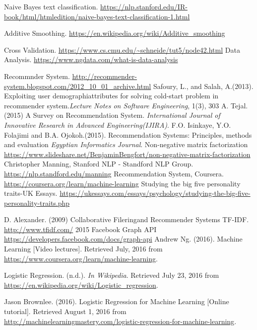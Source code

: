 \begin{thebibliography}{9}
	Naive Bayes text classification. \url{https://nlp.stanford.edu/IR-book/html/htmledition/naive-bayes-text-classification-1.html}

	Additive Smoothing. \url{https://en.wikipedia.org/wiki/Additive_smoothing}

Cross Validation. \url{https://www.cs.cmu.edu/~schneide/tut5/node42.html}
Data Analysis. \url{https://www.ngdata.com/what-is-data-analysis}

 Recommnder System. \url{http://recommender-system.blogspot.com/2012_10_01_archive.html}
	 Safoury, L., and Salah, A.(2013). Exploiting user demographiattributes for solving cold-start problem in recommender system.\textit{Lecture Notes on Software Engineering}, 1(3), 303
	A. Tejal.(2015) A Survey on Recommendation System. \textit{International Journal of Innovative Research in Advanced Engineering(IJIRA)}.
	F.O. Isinkaye, Y.O. Folajimi and B.A. Ojokoh.(2015). Recommendation Systems: Principles, methods and evaluation \textit{Egyptian Informatics Journal}.
	Non-negative matrix factorization \url{https://www.slideshare.net/BenjaminBengfort/non-negative-matrix-factorization}
Christopher Manning, Stanford NLP - Standford NLP Group. \url{https://nlp.standford.edu/manning}
	Recommendation System, Coursera. \url{https://coursera.org/learn/machine-learning}
Studying the big five personality traits-UK Essays. \url{https://ukessays.com/essays/psychology/studying-the-big-five-personality-traits.php}

D. Alexander. (2009) Collaborative Fileringand Recommender Systems
TF-IDF. \url{http://www.tfidf.com/} 2015
Facebook Graph API \url{https://developers.facebook.com/docs/graph-api}
  Andrew Ng. (2016). Machine Learning [Video lectures].
  Retrieved July, 2016 from \url{https://www.coursera.org/learn/machine-learning}.

  Logistic Regression. (n.d.). {\em In Wikipedia}. Retrieved July 23, 2016 from
  \url{https://en.wikipedia.org/wiki/Logistic_regression}.

  Jason Brownlee. (2016). Logistic Regression for Machine Learning [Online tutorial].
  Retrieved August 1, 2016 from
  \url{http://machinelearningmastery.com/logistic-regression-for-machine-learning}.

\end{thebibliography}
